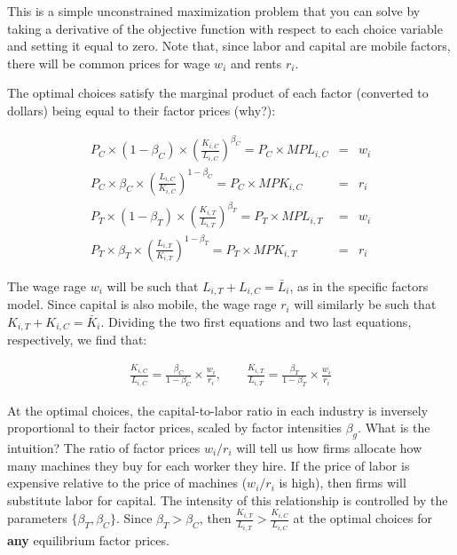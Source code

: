 \documentclass[11pt,letterpaper]{article}
\begin{document}
This is a simple unconstrained maximization problem that you can solve by taking a derivative of the objective function with respect to each choice variable and setting it equal to zero. Note that, since labor and capital are mobile factors, there will be common prices for wage $w_i$ and rents $r_i$. 

The optimal choices satisfy the marginal product of each factor (converted to dollars) being equal to their factor prices (why?):

\begin{eqnarray}
    P_{C} \times (1-\beta_C) \times \left( \frac{K_{i,C}}{L_{i,C}} \right)^{\beta_C} = P_C \times MPL_{i,C} &=& w_i     \\
    P_{C} \times  \beta_C \times \left( \frac{L_{i,C}}{K_{i,C}} \right)^{1-\beta_C} = P_C \times MPK_{i,C} &=& r_{i}   \\
    P_{T} \times (1-\beta_T) \times \left( \frac{K_{i,T}}{L_{i,T}} \right)^{\beta_T} =  P_T \times MPL_{i,T} &=& w_i \\ 
     P_{T}  \times \beta_T \times \left( \frac{L_{i,T}}{K_{i,T}} \right)^{1-\beta_T}    = P_T \times MPK_{i,T} &=& r_{i} 
\end{eqnarray}

The wage rage $w_i$ will be such that $L_{i,T} + L_{i,C} = \bar{L}_i$, as in the specific factors model. Since capital is also mobile, the wage rage $r_i$ will similarly be such that $K_{i,T} + K_{i,C} = \bar{K}_i$. Dividing the two first equations and two last equations, respectively, we find that:

\begin{eqnarray}\label{eq: capital-labor}
    \frac{K_{i,C}}{L_{i,C}} = \frac{\beta_C}{1-\beta_C} \times \frac{w_i}{r_i}, \qquad \frac{K_{i,T}}{L_{i,T}} = \frac{\beta_T}{1-\beta_T} \times \frac{w_i}{r_i} 
\end{eqnarray}

At the optimal choices, the capital-to-labor ratio in each industry is inversely proportional to their factor prices, scaled by factor intensities $\beta_g$.  What is the intuition? The ratio of factor prices $w_i/r_i$ will tell us how firms allocate how many machines they buy for each worker they hire. If the price of labor is expensive relative to the price of machines ($w_i/r_i$ is high), then firms will substitute labor for capital. The intensity of this relationship is controlled by the parameters $\{\beta_T, \beta_C\}$. Since $\beta_T > \beta_C$, then $ \frac{K_{i,T}}{L_{i,T}} > \frac{K_{i,C}}{L_{i,C}} $ at the optimal choices for \textbf{any} equilibrium factor prices.
\end{document}
